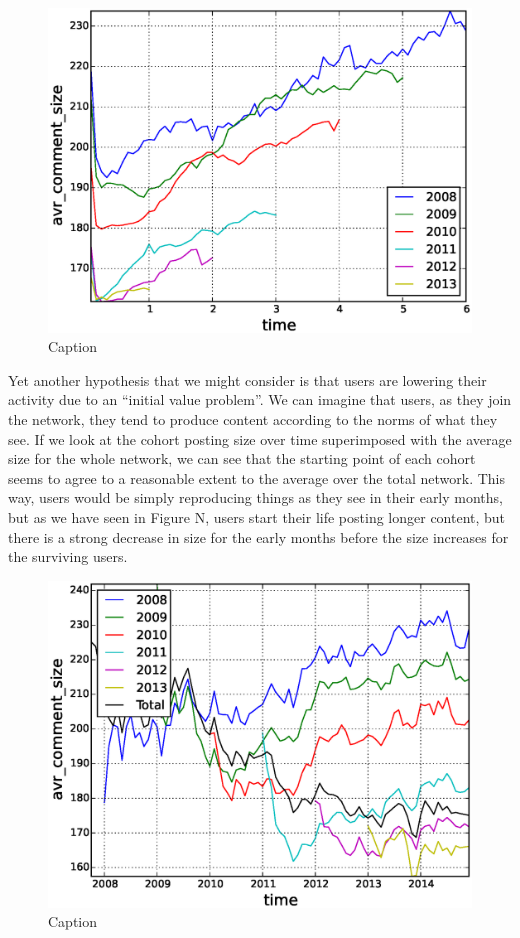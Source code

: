 \begin{figure}[!tb]
\centering
\includegraphics[scale=0.4]{./images/avr_comment_size_cohorts.eps}
\caption{Caption}
\label{fig:fig_label}
\end{figure}

Yet another hypothesis that we might consider is that users are lowering their activity due to an ``initial value problem''. We can imagine that users, as they join the network, they tend to produce content according to the norms of what they see. If we look at the cohort posting size over time superimposed with the average size for the whole network, we can see that the starting point of each cohort seems to agree to a reasonable extent to the average over the total network. This way, users would be simply reproducing things as they see in their early months, but as we have seen in Figure N, users start their life posting longer content, but there is a strong decrease in size for the early months before the size increases for the surviving users.

\begin{figure}[!tb]
\centering
\includegraphics[scale=0.4]{./images/avr_comment_size_over_time_cohorts.eps}
\caption{Caption}
\label{fig:fig_label}
\end{figure}

